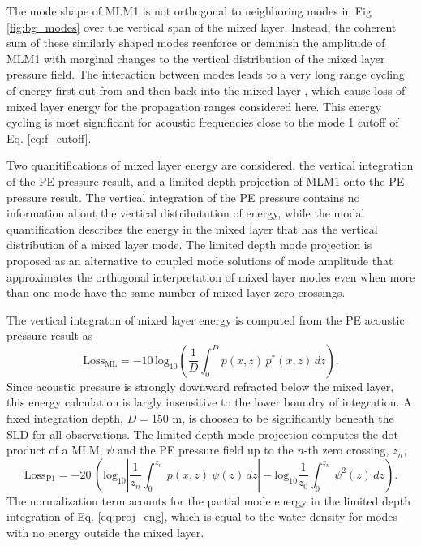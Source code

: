 \documentclass[preprint,NumberedRefs]{JASA}
\begin{document}
The mode shape of MLM1 is not orthogonal to neighboring modes in Fig \ref{fig:bg_modes} over the vertical span of the mixed layer. Instead, the coherent sum of these similarly shaped modes reenforce or deminish the amplitude of MLM1 with marginal changes to the vertical distribution of the mixed layer pressure field. The interaction between modes leads to a very long range cycling of energy first out from and then back into the mixed layer \citep{porter93}, which cause loss of mixed layer energy for the propagation ranges considered here. This energy cycling is most significant for acoustic frequencies close to the mode 1 cutoff of Eq. \eqref{eq:f_cutoff}.

Two quanitifications of mixed layer energy are considered, the vertical integration of the PE pressure result, and a limited depth projection of MLM1 onto the PE pressure result. The vertical integration of the PE pressure contains no information about the vertical distributution of energy, while the modal quantification describes the energy in the mixed layer that has the vertical distribution of a mixed layer mode. The limited depth mode projection is proposed as an alternative to coupled mode solutions of mode amplitude that approximates the orthogonal interpretation of mixed layer modes even when more than one mode have the same number of mixed layer zero crossings.

The vertical integraton of mixed layer energy is computed from the PE acoustic pressure result as
\begin{equation}
    \textrm{Loss}_{\textrm{ML}} = -10 \, \textrm{log}_{10} \left( \frac{1}{D} \int^{D}_0 p(x, z) \, p^* (x, z) \,  dz \right).
    \label{eq:int_eng}
\end{equation}
Since acoustic pressure is strongly downward refracted below the mixed layer, this energy calculation is largly insensitive to the lower boundry of integration. A fixed integration depth, $D=$150 m, is choosen to be significantly beneath the SLD for all observations. The limited depth mode projection computes the dot product of a MLM, $\psi$ and the PE pressure field up to the $n$-th zero crossing, $z_n$,
\begin{equation}
    \textrm{Loss}_{\textrm{P1}} = -20 \, \left( \textrm{log}_{10} \left| \frac{1}{z_n} \int^{z_n}_0 \, p(x, z) \ \psi(z) \,  dz \right| - \textrm{log}_{10} \frac{1}{z_0} \int^{z_n}_0 \, \psi^2(z) \,  dz \right).
    \label{eq:proj_eng}
\end{equation}
The normalization term acounts for the partial mode energy in the limited depth integration of Eq. \eqref{eq:proj_eng}, which is equal to the water density for modes with no energy outside the mixed layer\citep{jensen2011computational}.
\end{document}
